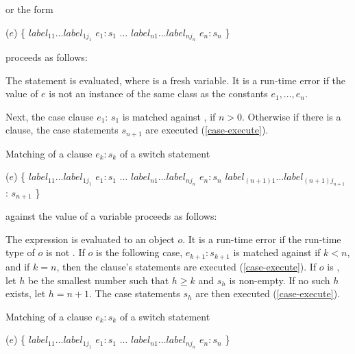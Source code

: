 \documentclass[makeidx]{article}
\begin{document}
{or the form

\begin{dartCode}
\SWITCH{} ($e$) \{
   $label_{11} \ldots label_{1j_1}$ \CASE{} $e_1: s_1$
   $\ldots$
   $label_{n1} \ldots label_{nj_n}$ \CASE{} $e_n: s_n$
\}
\end{dartCode}

proceeds as follows:

\LMHash{}%
The statement  is evaluated, where \id{} is a fresh variable.
It is a run-time error if the value of $e$ is
not an instance of the same class as the constants $e_1, \ldots, e_n$.


\LMHash{}%
Next, the case clause \CASE{} $e_{1}$: $s_{1}$ is matched against \id, if $n > 0$.
Otherwise if there is a \DEFAULT{} clause, the case statements $s_{n+1}$ are executed (\ref{case-execute}).

\LMHash{}%
Matching of a \CASE{} clause \CASE{} $e_{k}: s_{k}$ of a switch statement

\begin{dartCode}
\SWITCH{} ($e$) \{
   $label_{11} \ldots label_{1j_1}$ \CASE{} $e_1: s_1$
   $\ldots$
   $label_{n1} \ldots label_{nj_n}$ \CASE{} $e_n: s_n$
   $label_{(n+1)1} \ldots label_{(n+1)j_{n+1}}$ \DEFAULT{}: $s_{n+1}$
\}
\end{dartCode}

against the value of a variable \id{} proceeds as follows:

\LMHash{}%
The expression  is evaluated to an object $o$.
It is a run-time error if the run-time type of $o$ is not .
If $o$ is \FALSE{} the following case, \CASE{} $e_{k+1}: s_{k+1}$ is matched against \id{} if $k < n$, and if $k = n$, then the \DEFAULT{} clause's statements are executed (\ref{case-execute}).
If $o$ is \TRUE{}, let $h$ be the smallest number such that $h \ge k$ and $s_h$ is non-empty.
If no such $h$ exists, let $h = n + 1$.
The case statements $s_h$ are then executed (\ref{case-execute}).

\LMHash{}%
Matching of a \CASE{} clause \CASE{} $e_{k}: s_{k}$ of a switch statement

\begin{dartCode}
\SWITCH{} ($e$) \{
   $label_{11} \ldots label_{1j_1}$ \CASE{} $e_1: s_1$
   $\ldots$
   $label_{n1} \ldots label_{nj_n}$ \CASE{} $e_n: s_n$
\}
\end{dartCode}

}
\end{document}
